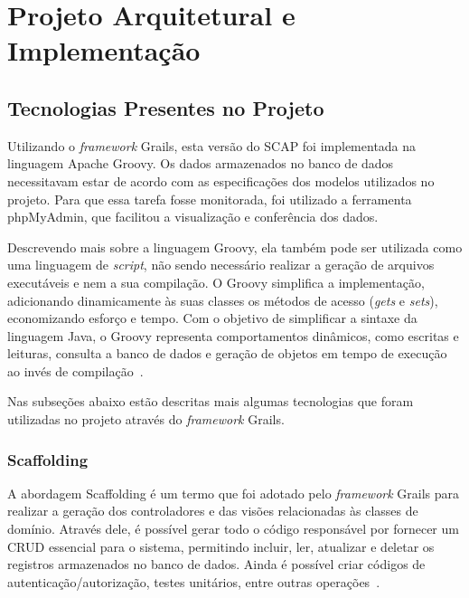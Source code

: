 \chapter{Projeto Arquitetural e Implementação}
\label{sec-projeto}


\section{Tecnologias Presentes no Projeto}
\label{sec-projeto-tecnologias-presentes}

Utilizando o \textit{framework} Grails, esta versão do SCAP foi implementada na linguagem Apache Groovy. Os dados armazenados no banco de dados necessitavam estar de acordo com as especificações dos modelos utilizados no projeto. Para que essa tarefa fosse monitorada, foi utilizado a ferramenta phpMyAdmin, que facilitou a visualização e conferência dos dados.

Descrevendo mais sobre a linguagem Groovy, ela também pode ser utilizada como uma linguagem de \textit{script}, não sendo necessário realizar a geração de arquivos executáveis e nem a sua compilação. O Groovy simplifica a implementação, adicionando dinamicamente às suas classes os métodos de acesso (\textit{gets} e \textit{sets}), economizando esforço e tempo. Com o objetivo de simplificar a sintaxe da linguagem Java, o Groovy representa comportamentos dinâmicos, como escritas e leituras, consulta a banco de dados e geração de objetos em tempo de execução ao invés de compilação~\cite{konig-et-al:gia07}.

Nas subseções abaixo estão descritas mais algumas tecnologias que foram utilizadas no projeto através do \textit{framework} Grails.

\subsection{Scaffolding}
\label{sec-projeto-scaffolding}

A abordagem Scaffolding é um termo que foi adotado pelo \textit{framework} Grails para realizar a geração dos controladores e das visões relacionadas às classes de domínio. Através dele, é possível gerar todo o código responsável por fornecer um CRUD essencial para o sistema, permitindo incluir, ler, atualizar e deletar os registros armazenados no banco de dados. Ainda é possível criar códigos de autenticação/autorização, testes unitários, entre outras operações~\cite{beder:ew12}.


